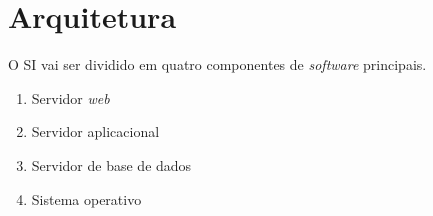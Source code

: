 \documentclass[12pt, a4paper, twoside]{report} %
\begin{document}

\chapter{Arquitetura}

O SI vai ser dividido em quatro componentes de \textit{software} principais.

\begin{enumerate}
\item Servidor \textit{web}
\item Servidor aplicacional
\item Servidor de base de dados
\item Sistema operativo
\end{enumerate}
\end{document}
